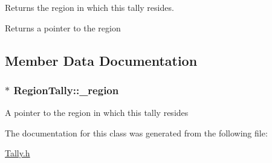 Returns the region in which this tally resides. 

\begin{DoxyReturn}{Returns}
a pointer to the region 
\end{DoxyReturn}


\subsection{Member Data Documentation}
\hypertarget{classRegionTally_ac9b5e8a2d01f73c79a22d5d6da0a376d}{
\subsubsection[{\-\_\-region}]{$\ast$ Region\-Tally\-::\-\_\-region\hspace{0.3cm}{\ttfamily [protected]}}}\label{classRegionTally_ac9b5e8a2d01f73c79a22d5d6da0a376d}
A pointer to the region in which this tally resides 

The documentation for this class was generated from the following file\-:\begin{DoxyCompactItemize}
\item 
\hyperlink{Tally_8h}{Tally.\-h}\end{DoxyCompactItemize}

